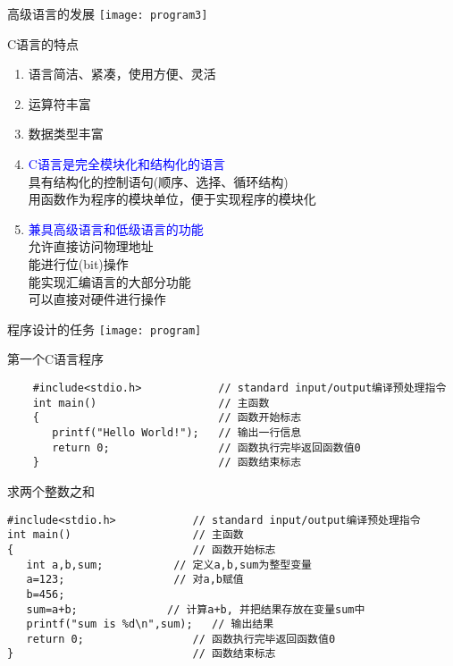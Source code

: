 \begin{frame}{高级语言的发展}
\texttt{[image: program3]}
\end{frame}

\begin{frame}{C语言的特点}
\begin{enumerate}
	\item 语言简洁、紧凑，使用方便、灵活
    \item 运算符丰富
    \item 数据类型丰富
    \item \textcolor{blue}{C语言是完全模块化和结构化的语言}\\
          具有结构化的控制语句(顺序、选择、循环结构)\\
          用函数作为程序的模块单位，便于实现程序的模块化
    \item \textcolor{blue}{兼具高级语言和低级语言的功能}\\
          允许直接访问物理地址\\
          能进行位(bit)操作\\  
          能实现汇编语言的大部分功能\\
          可以直接对硬件进行操作        
\end{enumerate}
\end{frame}

\begin{frame}{程序设计的任务}
\texttt{[image: program]}
\end{frame}

\begin{frame}[fragile]{第一个C语言程序}
    \begin{lstlisting}
    #include<stdio.h>            // standard input/output编译预处理指令
    int main()                   // 主函数
    {                            // 函数开始标志
       printf("Hello World!");   // 输出一行信息
       return 0;                 // 函数执行完毕返回函数值0
    }                            // 函数结束标志
    \end{lstlisting}
\end{frame}

\begin{frame}[fragile]{求两个整数之和}
\begin{lstlisting}
#include<stdio.h>            // standard input/output编译预处理指令
int main()                   // 主函数
{                            // 函数开始标志
   int a,b,sum;           // 定义a,b,sum为整型变量
   a=123;                 // 对a,b赋值
   b=456;
   sum=a+b;              // 计算a+b, 并把结果存放在变量sum中
   printf("sum is %d\n",sum);   // 输出结果
   return 0;                 // 函数执行完毕返回函数值0
}                            // 函数结束标志
\end{lstlisting}
\end{frame}

